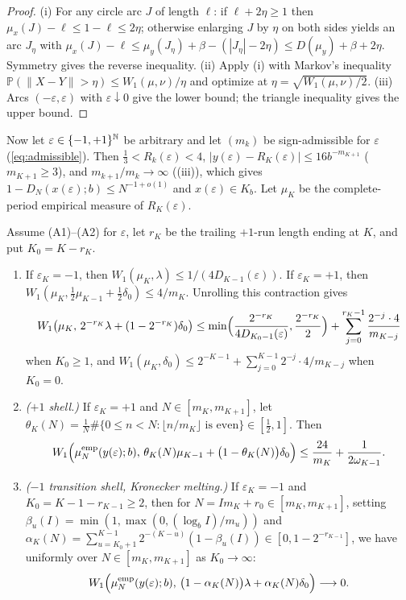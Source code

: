 \documentclass[11pt]{article}
\newcommand{\dist}[1]{\lVert #1\rVert}
\begin{document}
\begin{proof}
(i) For any circle arc $J$ of length $\ell$: if $\ell+2\eta\ge1$ then $\mu_x(J)-\ell\le 1-\ell\le 2\eta$; otherwise enlarging $J$ by $\eta$ on both sides yields an arc $J_\eta$ with $\mu_x(J)-\ell\le\mu_y(J_\eta)+\beta-(|J_\eta|-2\eta)\le D(\mu_y)+\beta+2\eta$. Symmetry gives the reverse inequality. (ii) Apply (i) with Markov's inequality $\mathbb P(\dist{X-Y}>\eta)\le W_1(\mu,\nu)/\eta$ and optimize at $\eta=\sqrt{W_1(\mu,\nu)/2}$. (iii) Arcs $(-\varepsilon,\varepsilon)$ with $\varepsilon\downarrow0$ give the lower bound; the triangle inequality gives the upper bound.
\end{proof}

Now let $\varepsilon\in\{-1,+1\}^{\mathbb N}$ be arbitrary and let $(m_k)$ be sign-admissible for $\varepsilon$ (\eqref{eq:admissible}). Then $\frac13<R_k(\varepsilon)<4$, $|y(\varepsilon)-R_K(\varepsilon)|\le 16b^{-m_{K+1}}$ ($m_{K+1}\ge3$), and $m_{k+1}/m_k\to\infty$ ((iii)), which gives $1-D_N(x(\varepsilon);b)\le N^{-1+o(1)}$ and $x(\varepsilon)\in K_b$. Let $\mu_K$ be the complete-period empirical measure of $R_K(\varepsilon)$.

\begin{proposition}\label{prop:shell-trajectories}
Assume \textup{(A1)}--\textup{(A2)} for $\varepsilon$, let $r_K$ be the trailing $+1$-run length ending at $K$, and put $K_0=K-r_K$.
\begin{enumerate}[label=\textup{(\roman*)},nosep]
\item If $\varepsilon_K=-1$, then $W_1(\mu_K,\lambda)\le 1/(4D_{K-1}(\varepsilon))$. If $\varepsilon_K=+1$, then $W_1(\mu_K,\frac12\mu_{K-1}+\frac12\delta_0)\le 4/m_K$. Unrolling this contraction gives
\[
W_1\bigl(\mu_K,\,2^{-r_K}\lambda+(1-2^{-r_K})\delta_0\bigr)\le\min\Bigl(\frac{2^{-r_K}}{4D_{K_0-1}(\varepsilon)},\frac{2^{-r_K}}{2}\Bigr)+\sum_{j=0}^{r_K-1}\frac{2^{-j}\cdot4}{m_{K-j}}
\]
when $K_0\ge1$, and $W_1(\mu_K,\delta_0)\le 2^{-K-1}+\sum_{j=0}^{K-1}2^{-j}\cdot 4/m_{K-j}$ when $K_0=0$.
\item \emph{($+1$ shell.)} If $\varepsilon_K=+1$ and $N\in[m_K,m_{K+1}]$, let $\theta_K(N)=\frac1N\#\{0\le n<N:\lfloor n/m_K\rfloor\text{ is even}\}\in[\frac12,1]$. Then
\[
W_1\Bigl(\mu_N^{\mathrm{emp}}(y(\varepsilon);b),\,\theta_K(N)\mu_{K-1}+\bigl(1-\theta_K(N)\bigr)\delta_0\Bigr)\le\frac{24}{m_K}+\frac1{2\omega_{K-1}}.
\]
\item \emph{($-1$ transition shell, Kronecker melting.)} If $\varepsilon_K=-1$ and $K_0=K-1-r_{K-1}\ge2$, then for $N=Im_K+r_0\in[m_K,m_{K+1}]$, setting $\beta_u(I)=\min(1,\max(0,(\log_b I)/m_u))$ and $\alpha_K(N)=\sum_{u=K_0+1}^{K-1}2^{-(K-u)}(1-\beta_u(I))\in[0,1-2^{-r_{K-1}}]$, we have uniformly over $N\in[m_K,m_{K+1}]$ as $K_0\to\infty$:
\[
W_1\Bigl(\mu_N^{\mathrm{emp}}(y(\varepsilon);b),\,\bigl(1-\alpha_K(N)\bigr)\lambda+\alpha_K(N)\delta_0\Bigr)\longrightarrow0.
\]
\end{enumerate}
\end{proposition}
\end{document}
